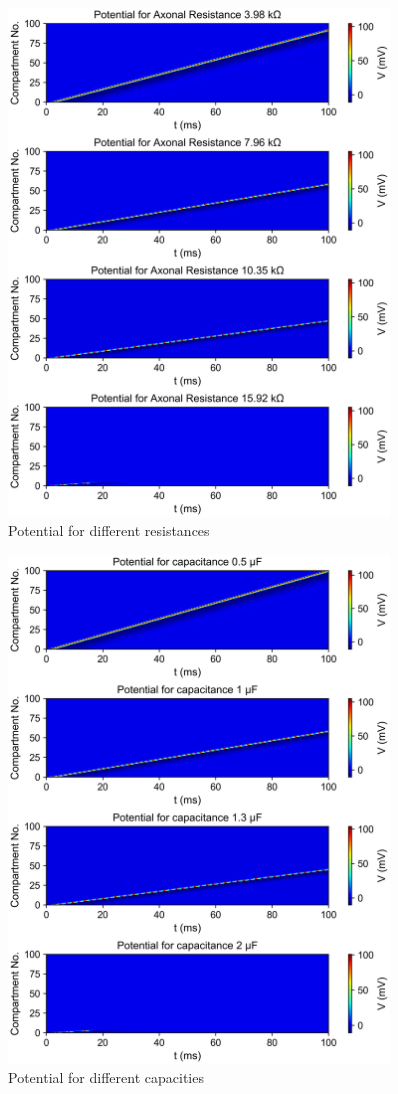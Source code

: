\documentclass{scrartcl}
\begin{document}
\begin{figure}[p]
	\centering
	\includegraphics[width=0.9\textwidth]{figures/potential_experiments_resistance}
	\caption{Potential for different resistances}
	\label{fig:resistance}
\end{figure}
\begin{figure}[p]
	\centering
	\includegraphics[width=0.9\textwidth]{figures/potential_experiments_capacitance}
	\caption{Potential for different capacities}
	\label{fig:capacitance}
\end{figure}
\end{document}
